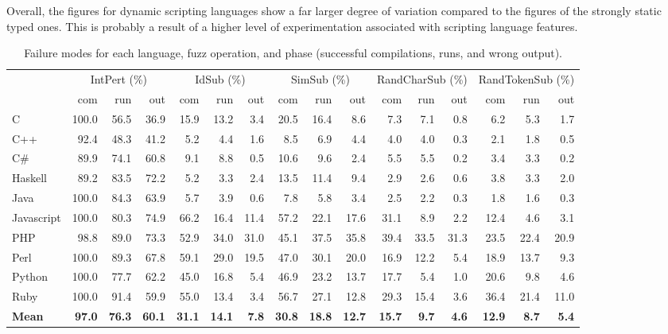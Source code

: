 \documentclass[10pt]{sigplanconf}
\begin{document}
Overall, the figures for dynamic scripting languages show a far larger
degree of variation compared to the figures of the strongly static typed
ones.
This is probably a result of a higher level of experimentation
associated with scripting language features.

\begin{table*}
\begin{center}
\begin{tabular}{ l r r r|r r r|r r r|r r r|r r r}
& \multicolumn{3}{c}{IntPert (\%)} & \multicolumn{3}{c}{IdSub (\%)} & \multicolumn{3}{c}{SimSub (\%)} & \multicolumn{3}{c}{RandCharSub (\%)} & \multicolumn{3}{c}{RandTokenSub (\%)}\\ 
	       & com  & run  & out  & com  & run  & out  & com  & run  & out  & com & run   & out  & com  & run  & out\\
\hline													
C & 100.0 & 56.5 & 36.9  & 15.9 & 13.2 & 3.4  & 20.5 & 16.4 & 8.6  & 7.3 & 7.1 & 0.8  & 6.2 & 5.3 & 1.7 \\
C++ & 92.4 & 48.3 & 41.2  & 5.2 & 4.4 & 1.6  & 8.5 & 6.9 & 4.4  & 4.0 & 4.0 & 0.3  & 2.1 & 1.8 & 0.5 \\
C\# & 89.9 & 74.1 & 60.8  & 9.1 & 8.8 & 0.5  & 10.6 & 9.6 & 2.4  & 5.5 & 5.5 & 0.2  & 3.4 & 3.3 & 0.2 \\
Haskell & 89.2 & 83.5 & 72.2  & 5.2 & 3.3 & 2.4  & 13.5 & 11.4 & 9.4  & 2.9 & 2.6 & 0.6  & 3.8 & 3.3 & 2.0 \\
Java & 100.0 & 84.3 & 63.9  & 5.7 & 3.9 & 0.6  & 7.8 & 5.8 & 3.4  & 2.5 & 2.2 & 0.3  & 1.8 & 1.6 & 0.3 \\
Javascript & 100.0 & 80.3 & 74.9  & 66.2 & 16.4 & 11.4  & 57.2 & 22.1 & 17.6  & 31.1 & 8.9 & 2.2  & 12.4 & 4.6 & 3.1 \\
PHP & 98.8 & 89.0 & 73.3  & 52.9 & 34.0 & 31.0  & 45.1 & 37.5 & 35.8  & 39.4 & 33.5 & 31.3  & 23.5 & 22.4 & 20.9 \\
Perl & 100.0 & 89.3 & 67.8  & 59.1 & 29.0 & 19.5  & 47.0 & 30.1 & 20.0  & 16.9 & 12.2 & 5.4  & 18.9 & 13.7 & 9.3 \\
Python & 100.0 & 77.7 & 62.2  & 45.0 & 16.8 & 5.4  & 46.9 & 23.2 & 13.7  & 17.7 & 5.4 & 1.0  & 20.6 & 9.8 & 4.6 \\
Ruby & 100.0 & 91.4 & 59.9  & 55.0 & 13.4 & 3.4  & 56.7 & 27.1 & 12.8  & 29.3 & 15.4 & 3.6  & 36.4 & 21.4 & 11.0 \\
\textbf{Mean} & \textbf{97.0} & \textbf{76.3} & \textbf{60.1}  & \textbf{31.1} & \textbf{14.1} & \textbf{7.8}  & \textbf{30.8} & \textbf{18.8} & \textbf{12.7}  & \textbf{15.7} & \textbf{9.7} & \textbf{4.6}  & \textbf{12.9} & \textbf{8.7} & \textbf{5.4} \\
\end{tabular}
\end{center}
\caption{Failure modes for each language, fuzz operation, and phase (successful compilations, runs, and wrong output).}
\label{tbl:aggregated-per-language}
\end{table*}
\end{document}
